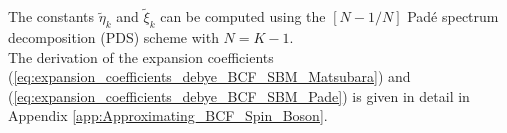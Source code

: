 The constants $\tilde{\eta}_k$ and $\tilde{\xi}_k$ can be computed using the $[N-1/N]$ Padé spectrum decomposition (PDS) scheme \cite{Hu:2011}
with $N = K - 1$. \\
The derivation of the expansion coefficients (\ref{eq:expansion_coefficients_debye_BCF_SBM_Matsubara}) and (\ref{eq:expansion_coefficients_debye_BCF_SBM_Pade}) is given in detail in Appendix \ref{app:Approximating_BCF_Spin_Boson}.
